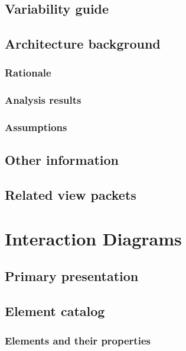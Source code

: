 \documentclass[a4paper,10pt]{book}
\begin{document}
\subsection{Variability guide}

\subsection{Architecture background}

\subsubsection{Rationale}

\subsubsection{Analysis results}

\subsubsection{Assumptions}

\subsection{Other information}

\subsection{Related view packets}



\section{Interaction Diagrams}

\subsection{Primary presentation}

\subsection{Element catalog}

\subsubsection{Elements and their properties}
\end{document}

